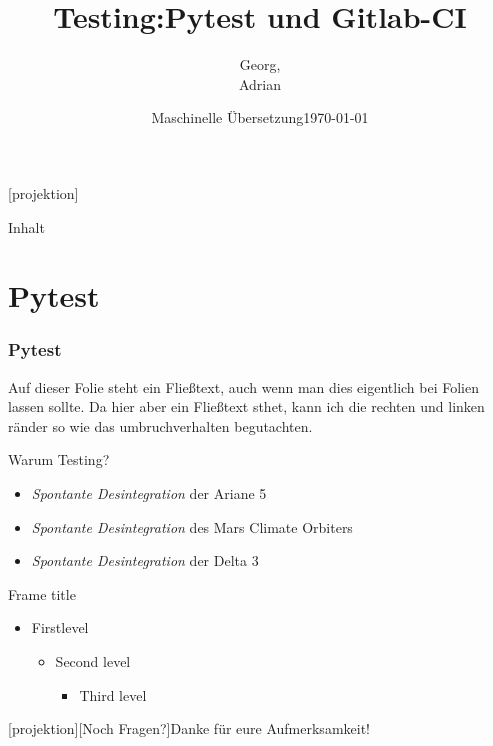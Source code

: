 \documentclass[t]{beamer}
\title{Testing:Pytest und Gitlab-CI}
\subtitle{}
\date[RWTH]{Maschinelle Übersetzung\enskip \enskip\today}
\author{Georg,\\Adrian}
\institute[RWTH]{RWTH Aachen University}
\begin{document}
[projektion]{}
\begin{frame}[plain]
\titlepage
\end{frame}




\begin{frame}{Inhalt}
  \tableofcontents
\end{frame}

\section{Pytest}
\begin{frame}
  \frametitle{Pytest}
  Auf dieser Folie steht ein Fließtext, auch wenn man dies eigentlich
  bei Folien lassen sollte.  Da hier aber ein Fließtext sthet, kann
  ich die rechten und linken ränder so wie das umbruchverhalten begutachten.
\end{frame}
\begin{frame}{Warum Testing?}
  \begin{itemize}
  \item \emph{Spontante Desintegration} der Ariane 5
  \item \emph{Spontante Desintegration} des Mars Climate Orbiters
  \item \emph{Spontante Desintegration} der Delta 3
  \end{itemize}
\end{frame}

\begin{frame}{Frame title}
  \begin{itemize}
    \item First\alert{level}
    \begin{itemize}
      \item Second level
      \begin{itemize}
      \item Third level
    \end{itemize}
  \end{itemize}
\end{itemize}
\end{frame}

[projektion][Noch Fragen?]{Danke für
  eure Aufmerksamkeit!}
\begin{frame}[plain]
\end{frame}
\end{document}
